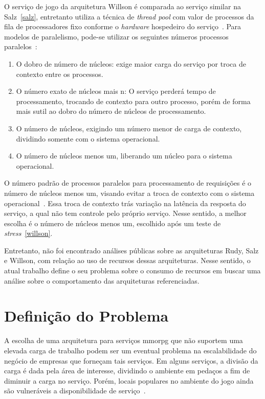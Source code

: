 O serviço de jogo da arquitetura Willson é comparada ao serviço similar na Salz~\ref{salz}, entretanto utiliza a técnica de \textit{thread pool} com valor de processos da fila de processadores fixo conforme o \textit{hardware} hospedeiro do serviço~\cite{stephenclarkewillson2017}.
%
Para modelos de paralelismo, pode-se utilizar os seguintes números processos paralelos~\cite{willson}:


\begin{enumerate}
  \item O dobro de número de núcleos: exige maior carga do serviço por troca de contexto entre os processos.
  \item O número exato de núcleos mais n: O serviço perderá tempo de processamento, trocando de contexto para outro processo, porém de forma mais sutil ao dobro do número de núcleos de processamento.
  \item O número de núcleos, exigindo um número menor de carga de contexto, dividindo somente com o sistema operacional.
  \item O número de núcleos menos um, liberando um núcleo para o sistema operacional.
\end{enumerate}

O número padrão de processos paralelos para processamento de requisições é o número de núcleos menos um, visando evitar a troca de contexto com o sistema operacional~\cite{willson}.
%
Essa troca de contexto trás variação na latência da resposta do serviço, a qual não tem controle pelo próprio serviço.
%
Nesse sentido, a melhor escolha é o número de núcleos menos um, escolhido após um teste de \textit{stress}~\ref{willson}.



Entretanto, não foi encontrado análises públicas sobre as arquiteturas Rudy, Salz e Willson, com relação ao uso de recursos dessas arquiteturas.
%
Nesse sentido, o atual trabalho define o seu problema sobre o consumo de recursos em buscar uma análise sobre o comportamento das arquiteturas referenciadas.

\section{Definição do Problema}



A escolha de uma arquitetura para serviços \ac{mmorpg} que não suportem uma elevada carga de trabalho podem ser um eventual problema na escalabilidade do negócio de empresas que forneçam tais serviços.
%
Em alguns serviços, a divisão da carga é dada pela área de interesse, dividindo o ambiente em pedaços a fim de diminuir a carga no serviço.
%
Porém, locais populares no ambiente do jogo ainda são vulneráveis a disponibilidade de serviço~\cite{1417630}.



